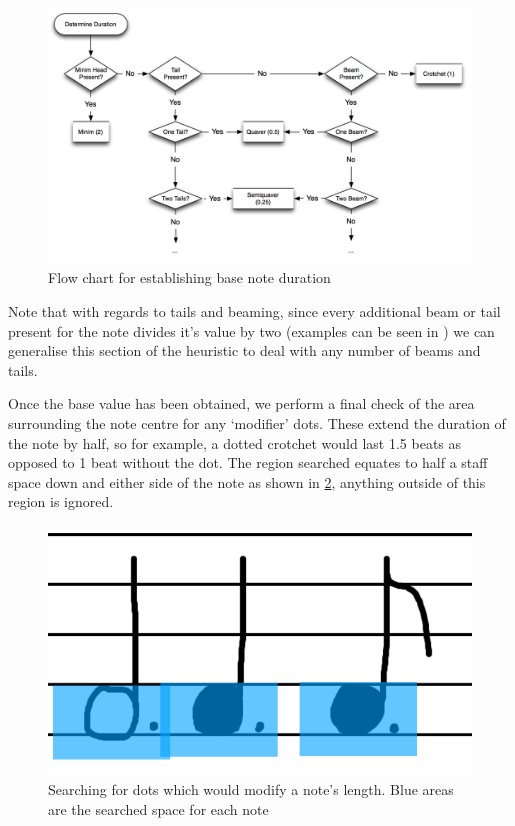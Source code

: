 \begin{figure}[H]
  \includegraphics[width=\linewidth]{gfx/implementation/duration-diagram.png}
  \caption{Flow chart for establishing base note duration}
  \label{fig:note-duration-flow-chart}
\end{figure}

Note that with regards to tails and beaming, since every additional beam or tail present for the note divides it's value by two (examples can be seen in ) we can generalise this section of the heuristic to deal with any number of beams and tails.

Once the base value has been obtained, we perform a final check of the area surrounding the note centre for any `modifier' dots. These extend the duration of the note by half, so for example, a dotted crotchet would last 1.5 beats as opposed to 1 beat without the dot. The region searched equates to half a staff space down and either side of the note as shown in \cref{fig:identify-dot}, anything outside of this region is ignored.


\begin{figure}[H]
  \includegraphics[width=\linewidth]{gfx/implementation/dot-identification.png}
  \caption{Searching for dots which would modify a note's length. Blue areas are the searched space for each note}
  \label{fig:identify-dot}
\end{figure}